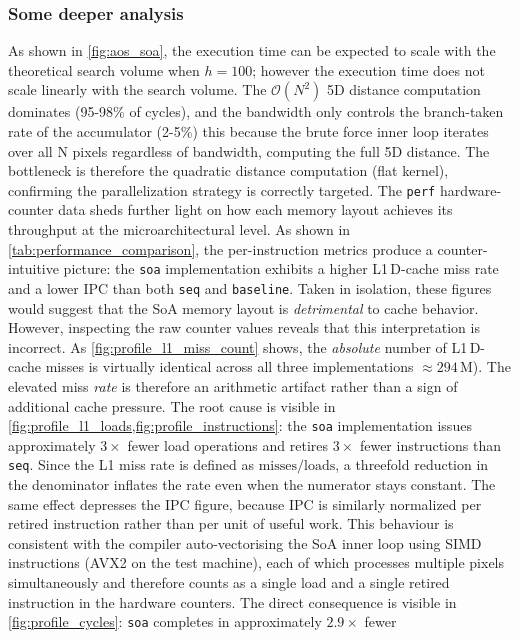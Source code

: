 \documentclass[10pt,twocolumn,letterpaper]{article}
\begin{document}
\subsubsection{Some deeper analysis} \label{subsubsec:profiling}
As shown in \cref{fig:aos_soa}, the execution time can be expected to scale with the theoretical search volume when $h=100$; however the execution time does not scale linearly with the search volume. The $\mathcal O(N^2)$ 5D distance computation dominates (95-98\% of cycles), and the bandwidth only controls the branch-taken rate of the accumulator (2-5\%) this because the brute force inner loop iterates over all N pixels regardless of bandwidth, computing the full 5D distance. The bottleneck is therefore the quadratic distance computation (flat kernel), confirming the parallelization strategy is correctly targeted. The \texttt{perf} hardware-counter data sheds further light on how each memory
layout achieves its throughput at the microarchitectural level.
As shown in \cref{tab:performance_comparison}, the per-instruction metrics produce a counter-intuitive picture: the \texttt{soa} implementation exhibits a higher L1\,D-cache miss rate and a lower IPC than both \texttt{seq} and \texttt{baseline}. Taken in isolation, these figures would suggest that the SoA memory layout is \emph{detrimental} to cache behavior. However, inspecting the raw counter values reveals that this interpretation is incorrect. As \cref{fig:profile_l1_miss_count} shows, the \emph{absolute} number of L1\,D-cache misses is virtually identical across all three implementations $\approx 294\,\text{M}$). The elevated miss \emph{rate} is therefore an arithmetic artifact rather than a sign of additional cache pressure. The root cause is visible in \cref{fig:profile_l1_loads,fig:profile_instructions}:
the \texttt{soa} implementation issues approximately $3\times$ fewer load operations
and retires $3\times$ fewer instructions than \texttt{seq}. Since the L1 miss rate
is defined as $\text{misses} / \text{loads}$, a threefold reduction in the
denominator inflates the rate even when the numerator stays constant. The same
effect depresses the IPC figure, because IPC is similarly normalized per retired
instruction rather than per unit of useful work.
This behaviour is consistent with the compiler auto-vectorising the SoA inner
loop using SIMD instructions (AVX2 on the test machine), each of which processes
multiple pixels simultaneously and therefore counts as a single load and a single
retired instruction in the hardware counters. The direct consequence is visible in
\cref{fig:profile_cycles}: \texttt{soa} completes in approximately $2.9\times$ fewer
\end{document}

